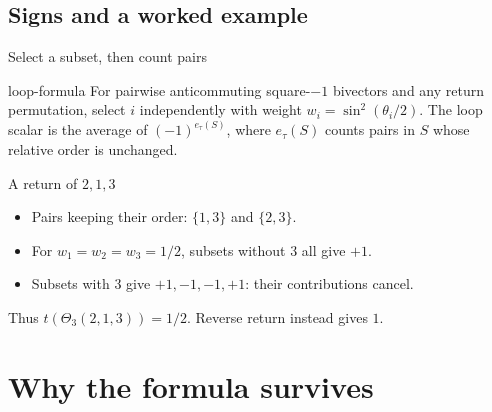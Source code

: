 \documentclass{beamer}
\begin{document}
\subsection{Signs and a worked example}
\begin{frame}{Select a subset, then count pairs}
  \begin{bookresult}{loop-formula}
    For pairwise anticommuting square-$-1$ bivectors and any return permutation, select $i$ independently with weight $w_i=\sin^2(\theta_i/2)$.
    The loop scalar is the average of $(-1)^{e_\tau(S)}$, where $e_\tau(S)$ counts pairs in $S$ whose relative order is unchanged.
  \end{bookresult}
\end{frame}
\begin{frame}{A return of $2,1,3$}
  \begin{itemize}
    \item Pairs keeping their order: $\{1,3\}$ and $\{2,3\}$.
    \item For $w_1=w_2=w_3=1/2$, subsets without $3$ all give $+1$.
    \item Subsets with $3$ give $+1,-1,-1,+1$: their contributions cancel.
  \end{itemize}
  Thus $t(\Theta_3(2,1,3))=1/2$. Reverse return instead gives $1$.
\end{frame}
\section{Why the formula survives}
\end{document}
